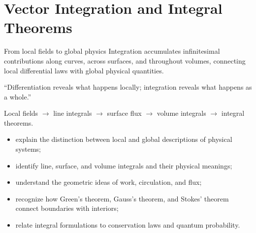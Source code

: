 \chapter{Vector Integration and Integral Theorems}
\chapteropeningart
{From local fields to global physics}
{Integration accumulates infinitesimal contributions along curves, across
surfaces, and throughout volumes, connecting local differential laws with
global physical quantities.}

\chapterquote
{``Differentiation reveals what happens locally; integration reveals what
happens as a whole.''}
{}

\begin{roadmapbox}
Local fields $\longrightarrow$ line integrals $\longrightarrow$ surface flux
$\longrightarrow$ volume integrals $\longrightarrow$ integral theorems.
\end{roadmapbox}


\learningobjectives

\begin{itemize}
  \item explain the distinction between local and global descriptions of physical systems;
  \item identify line, surface, and volume integrals and their physical meanings;
  \item understand the geometric ideas of work, circulation, and flux;
  \item recognize how Green's theorem, Gauss's theorem, and Stokes' theorem connect boundaries with interiors;
  \item relate integral formulations to conservation laws and quantum probability.
\end{itemize}

\newpage



